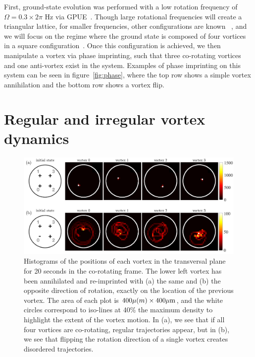 First, ground-state evolution was performed with a low rotation frequency of $\Omega = 0.3 \times 2\pi$ Hz via GPUE~\cite{schloss2018}.
Though large rotational frequencies will create a triangular lattice, for smaller frequencies, other configurations are known ~\cite{aftalion2001}, and we will focus on the regime where the ground state is composed of four vortices in a square configuration~\cite{zampetaki2013}.
Once this configuration is achieved, we then manipulate a vortex via phase imprinting, such that three co-rotating vortices and one anti-vortex exist in the system.
Examples of phase imprinting on this system can be seen in figure~\ref{fig:phase}, where the top row shows a simple vortex annihilation and the bottom row shows a vortex flip.

\section{Regular and irregular vortex dynamics}

\begin{figure}
\includegraphics[width=\textwidth]{data/2d/histogram/histogram}

\caption{
Histograms of the positions of each vortex in the transversal plane for 20 seconds in the co-rotating frame.
The lower left vortex has been annihilated and re-imprinted with (a) the same and (b) the opposite direction of rotation, exactly on the location of the previous vortex.
The area of each plot is $400\mu \text(m) \times 400 \mu \text{m}$, and the white circles correspond to iso-lines at 40\% the maximum density to highlight the extent of the vortex motion.
In (a), we see that if all four vortices are co-rotating, regular trajectories appear, but in (b), we see that flipping the rotation direction of a single vortex creates disordered trajectories.
}
\label{fig:histogram}
\end{figure}

